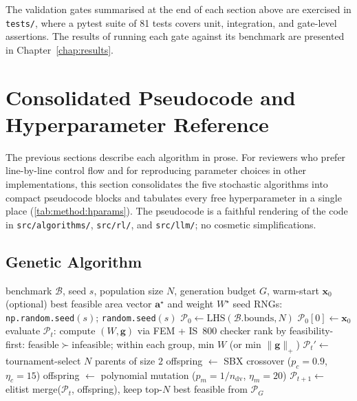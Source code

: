 The validation gates summarised at the end of each section above
are exercised in \texttt{tests/}, where a pytest suite of \num{81}
tests covers unit, integration, and gate-level assertions. The
results of running each gate against its benchmark are presented
in Chapter~\ref{chap:results}.

\section{Consolidated Pseudocode and Hyperparameter Reference}
\label{sec:method:pseudocode}

The previous sections describe each algorithm in prose. For
reviewers who prefer line-by-line control flow and for reproducing
parameter choices in other implementations, this section
consolidates the five stochastic algorithms into compact
pseudocode blocks and tabulates every free hyperparameter in a
single place (\cref{tab:method:hparams}). The pseudocode is a
faithful rendering of the code in \texttt{src/algorithms/},
\texttt{src/rl/}, and \texttt{src/llm/}; no cosmetic
simplifications.

\subsection{Genetic Algorithm}
\label{sec:method:pseudocode:ga}

\begin{algorithm}[H]
\small
\caption{Genetic Algorithm for truss sizing (\texttt{src/algorithms/ga.py})}
\label{alg:ga}
\begin{algorithmic}[1]
\Require benchmark $\mathcal{B}$, seed $s$, population size
  $N$, generation budget $G$, warm-start $\mathbf{x}_0$ (optional)
\Ensure best feasible area vector $\mathbf{a}^\star$ and weight $W^\star$
\State seed RNGs: \texttt{np.random.seed}$(s)$; \texttt{random.seed}$(s)$
\State $\mathcal{P}_0 \gets \text{LHS}(\mathcal{B}.\text{bounds},N)$
  \State $\mathcal{P}_0[0] \gets \mathbf{x}_0$ 
\EndIf
{}
  \State evaluate $\mathcal{P}_t$: compute $(W,\mathbf{g})$ via FEM + IS~800 checker
  \State rank by feasibility-first: feasible$\succ$infeasible; within each group, min $W$ (or min $\|\mathbf{g}\|_+$)
  \State $\mathcal{P}_t' \gets$ tournament-select $N$ parents of size $2$
  \State offspring $\gets$ SBX crossover ($p_c=\num{0.9}$, $\eta_c=\num{15}$)
  \State offspring $\gets$ polynomial mutation ($p_m=1/n_{\mathrm{dv}}$, $\eta_m=\num{20}$)
  \State $\mathcal{P}_{t+1}\gets$ elitist merge($\mathcal{P}_t$, offspring), keep top-$N$
\EndFor
\State \Return best feasible from $\mathcal{P}_G$
\end{algorithmic}
\end{algorithm}


